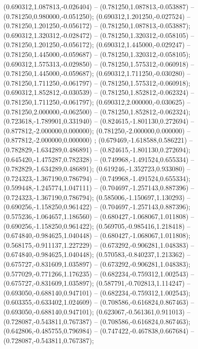  (0.690312,1.087813,-0.026404) -- (0.781250,1.087813,-0.053887) -- (0.781250,0.980000,-0.051250);
 (0.690312,1.201250,-0.027524) -- (0.781250,1.201250,-0.056172) -- (0.781250,1.087813,-0.053887);
 (0.690312,1.320312,-0.028472) -- (0.781250,1.320312,-0.058105) -- (0.781250,1.201250,-0.056172);
 (0.690312,1.445000,-0.029247) -- (0.781250,1.445000,-0.059687) -- (0.781250,1.320312,-0.058105);
 (0.690312,1.575313,-0.029850) -- (0.781250,1.575312,-0.060918) -- (0.781250,1.445000,-0.059687);
 (0.690312,1.711250,-0.030280) -- (0.781250,1.711250,-0.061797) -- (0.781250,1.575312,-0.060918);
 (0.690312,1.852812,-0.030539) -- (0.781250,1.852812,-0.062324) -- (0.781250,1.711250,-0.061797);
 (0.690312,2.000000,-0.030625) -- (0.781250,2.000000,-0.062500) -- (0.781250,1.852812,-0.062324);
 (0.723618,-1.789901,0.331940) -- (0.824615,-1.801130,0.272694) -- (0.877812,-2.000000,0.000000);
 (0.781250,-2.000000,0.000000) -- (0.877812,-2.000000,0.000000) ;
 (0.679469,-1.618588,0.586221) -- (0.782829,-1.634289,0.486891) -- (0.824615,-1.801130,0.272694);
 (0.645420,-1.475287,0.782328) -- (0.749968,-1.491524,0.655334) -- (0.782829,-1.634289,0.486891);
 (0.619246,-1.352723,0.933080) -- (0.724323,-1.367190,0.786794) -- (0.749968,-1.491524,0.655334);
 (0.599448,-1.245774,1.047111) -- (0.704697,-1.257143,0.887396) -- (0.724323,-1.367190,0.786794);
 (0.585006,-1.150697,1.130293) -- (0.690256,-1.158250,0.961422) -- (0.704697,-1.257143,0.887396);
 (0.575236,-1.064657,1.186560) -- (0.680427,-1.068067,1.011808) -- (0.690256,-1.158250,0.961422);
 (0.569705,-0.985416,1.218418) -- (0.674840,-0.984625,1.040448) -- (0.680427,-1.068067,1.011808);
 (0.568175,-0.911137,1.227229) -- (0.673292,-0.906281,1.048383) -- (0.674840,-0.984625,1.040448);
 (0.570583,-0.840237,1.213362) -- (0.675727,-0.831609,1.035897) -- (0.673292,-0.906281,1.048383);
 (0.577029,-0.771266,1.176235) -- (0.682234,-0.759312,1.002543) -- (0.675727,-0.831609,1.035897);
 (0.587791,-0.702813,1.114247) -- (0.693050,-0.688140,0.947101) -- (0.682234,-0.759312,1.002543);
 (0.603355,-0.633402,1.024609) -- (0.708586,-0.616824,0.867463) -- (0.693050,-0.688140,0.947101);
 (0.623067,-0.561361,0.911013) -- (0.728087,-0.543811,0.767387) -- (0.708586,-0.616824,0.867463);
 (0.642806,-0.485755,0.796984) -- (0.747422,-0.467838,0.667684) -- (0.728087,-0.543811,0.767387);
